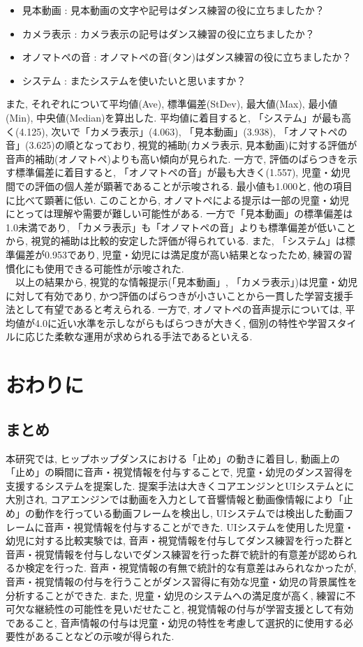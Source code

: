 \documentclass[paper]{ieicej}
\begin{document}
\begin{itemize}[nosep]
  \item 見本動画 : 見本動画の文字や記号はダンス練習の役に立ちましたか？
  \item カメラ表示 : カメラ表示の記号はダンス練習の役に立ちましたか？
  \item オノマトペの音 : オノマトペの音(タン)はダンス練習の役に立ちましたか？
  \item システム : またシステムを使いたいと思いますか？
\end{itemize}
また, それぞれについて平均値(Ave), 標準偏差(StDev), 最大値(Max), 最小値(Min), 中央値(Median)を算出した. 平均値に着目すると, 「システム」が最も高く(4.125), 次いで「カメラ表示」(4.063), 「見本動画」(3.938), 「オノマトペの音」(3.625)の順となっており, 視覚的補助(カメラ表示, 見本動画)に対する評価が音声的補助(オノマトペ)よりも高い傾向が見られた. 一方で, 評価のばらつきを示す標準偏差に着目すると, 「オノマトペの音」が最も大きく(1.557), 児童・幼児間での評価の個人差が顕著であることが示唆される. 最小値も1.000と, 他の項目に比べて顕著に低い. このことから, オノマトペによる提示は一部の児童・幼児にとっては理解や需要が難しい可能性がある. 一方で「見本動画」の標準偏差は1.0未満であり, 「カメラ表示」も「オノマトペの音」よりも標準偏差が低いことから, 視覚的補助は比較的安定した評価が得られている. また, 「システム」は標準偏差が0.953であり, 児童・幼児には満足度が高い結果となったため, 練習の習慣化にも使用できる可能性が示唆された. \\
　以上の結果から, 視覚的な情報提示(「見本動画」, 「カメラ表示」)は児童・幼児に対して有効であり, かつ評価のばらつきが小さいことから一貫した学習支援手法として有望であると考えられる. 一方で, オノマトペの音声提示については, 平均値が4.0に近い水準を示しながらもばらつきが大きく, 個別の特性や学習スタイルに応じた柔軟な運用が求められる手法であるといえる. 
\section{おわりに}
\subsection{まとめ}
本研究では, ヒップホップダンスにおける「止め」の動きに着目し, 動画上の「止め」の瞬間に音声・視覚情報を付与することで, 児童・幼児のダンス習得を支援するシステムを提案した. 提案手法は大きくコアエンジンとUIシステムとに大別され, コアエンジンでは動画を入力として音響情報と動画像情報により「止め」の動作を行っている動画フレームを検出し, UIシステムでは検出した動画フレームに音声・視覚情報を付与することができた. UIシステムを使用した児童・幼児に対する比較実験では, 音声・視覚情報を付与してダンス練習を行った群と音声・視覚情報を付与しないでダンス練習を行った群で統計的有意差が認められるか検定を行った. 音声・視覚情報の有無で統計的な有意差はみられなかったが, 音声・視覚情報の付与を行うことがダンス習得に有効な児童・幼児の背景属性を分析することができた. また, 児童・幼児のシステムへの満足度が高く, 練習に不可欠な継続性の可能性を見いだせたこと, 視覚情報の付与が学習支援として有効であること, 音声情報の付与は児童・幼児の特性を考慮して選択的に使用する必要性があることなどの示唆が得られた.
\end{document}
